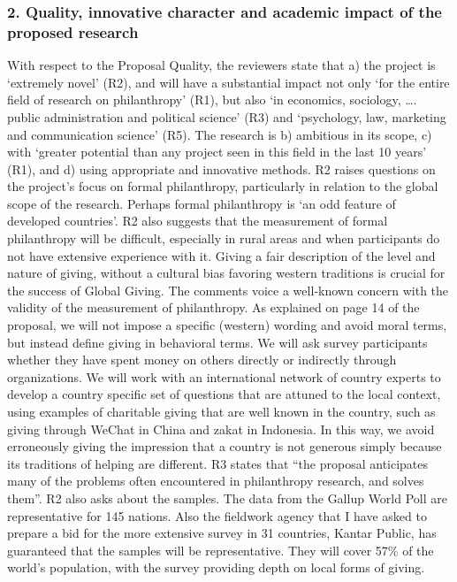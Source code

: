 \documentclass[twocolumn, serif, rga, numeric]{jote-article}
\begin{document}
\subsubsection{2. Quality, innovative character and academic impact of the proposed research}
With respect to the Proposal Quality, the reviewers state that a) the project is ‘extremely novel’ (R2), and will have a substantial impact not only ‘for the entire field of research on philanthropy’ (R1), but also ‘in economics, sociology, …. public administration and political science’ (R3) and ‘psychology, law, marketing and communication science’ (R5). The research is b) ambitious in its scope, c) with ‘greater potential than any project seen in this field in the last 10 years’ (R1), and d) using appropriate and innovative methods. 
R2 raises questions on the project’s focus on formal philanthropy, particularly in relation to the global scope of the research. Perhaps formal philanthropy is ‘an odd feature of developed countries’. R2 also suggests that the measurement of formal philanthropy will be difficult, especially in rural areas and when participants do not have extensive experience with it.
Giving a fair description of the level and nature of giving, without a cultural bias favoring western traditions is crucial for the success of Global Giving. The comments voice a well‐known concern with the validity of the measurement of philanthropy. As explained on page 14 of the proposal, we will not impose a specific (western) wording and avoid moral terms, but instead define giving in behavioral terms. We will ask survey participants whether they have spent money on others directly or indirectly through organizations. We will work with an international network of country experts to develop a country specific set of questions that are attuned to the local context, using examples of charitable giving that are well known in the country, such as giving through WeChat in China and zakat in Indonesia. In this way, we avoid erroneously giving the impression that a country is not generous simply because its traditions of helping are different. R3 states that “the proposal anticipates many of the problems often encountered in philanthropy research, and solves them”.
R2 also asks about the samples. The data from the Gallup World Poll are representative for 145 nations. Also the fieldwork agency that I have asked to prepare a bid for the more extensive survey in 31 countries, Kantar Public, has guaranteed that the samples will be representative. They will cover 57\% of the world’s population, with the survey providing depth on local forms of giving.
\end{document}
